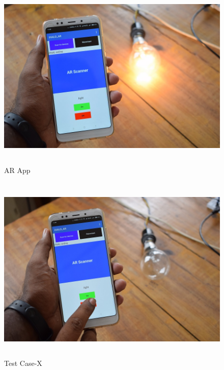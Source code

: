 \begin{figure}[H]
	
	\centering
	\includegraphics[width=\linewidth,height=9cm] {./images/p40.jpg}
	\caption{AR App}
	\label{manual}
\end{figure}

\begin{figure}[H]
	
	\centering
	\includegraphics[width=\linewidth,height=9cm] {./images/p41.jpg}
	\caption{Test Case-X}
	\label{manual}
\end{figure}

